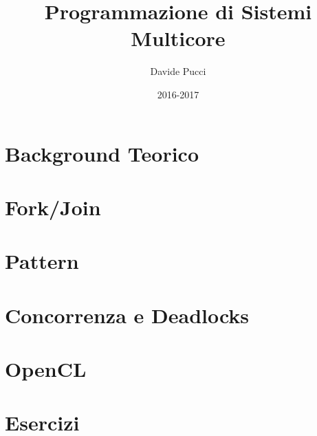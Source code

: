

\title{Programmazione di Sistemi Multicore}
\author{Davide Pucci}
\date{2016-2017}


	
\maketitle
	
\tableofcontents

\chapter{Background Teorico}


\chapter{Fork/Join}


\chapter{Pattern}


\chapter{Concorrenza e Deadlocks}


\chapter{OpenCL}


\chapter{Esercizi}


